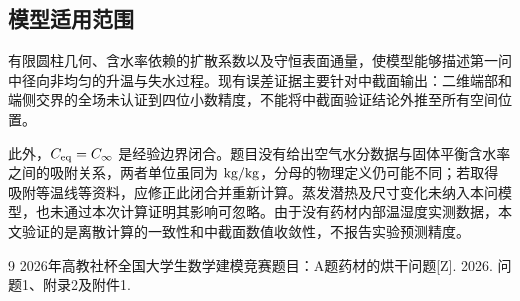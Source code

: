 \subsection{模型适用范围}
有限圆柱几何、含水率依赖的扩散系数以及守恒表面通量，使模型能够描述第一问中径向非均匀的升温与失水过程。现有误差证据主要针对中截面输出：二维端部和端侧交界的全场未认证到四位小数精度，不能将中截面验证结论外推至所有空间位置。

此外，$C_{\mathrm{eq}}=C_\infty$ 是经验边界闭合。题目没有给出空气水分数据与固体平衡含水率之间的吸附关系，两者单位虽同为 $\mathrm{kg/kg}$，分母的物理定义仍可能不同；若取得吸附等温线等资料，应修正此闭合并重新计算。蒸发潜热及尺寸变化未纳入本问模型，也未通过本次计算证明其影响可忽略。由于没有药材内部温湿度实测数据，本文验证的是离散计算的一致性和中截面数值收敛性，不报告实验预测精度。

\begin{thebibliography}{9}
\small
{} 2026年高教社杯全国大学生数学建模竞赛题目：A题药材的烘干问题[Z]. 2026. 问题1、附录2及附件1.
\end{thebibliography}
